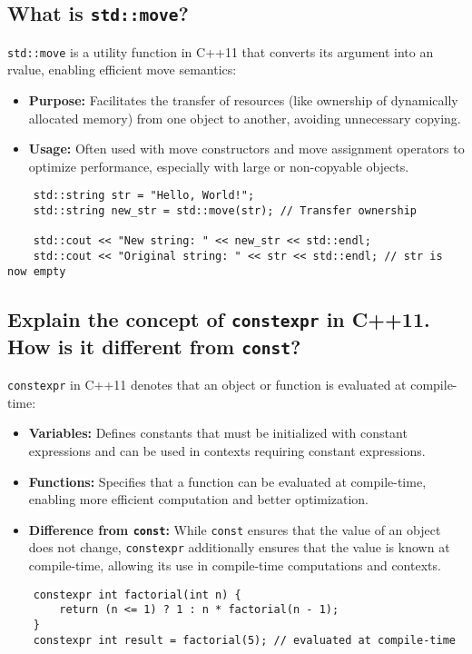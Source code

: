 \subsection{What is \texttt{std::move}?}
\texttt{std::move} is a utility function in C++11 that converts its argument into an rvalue, enabling efficient move semantics:
\begin{itemize}
    \item \textbf{Purpose:} Facilitates the transfer of resources (like ownership of dynamically allocated memory) from one object to another, avoiding unnecessary copying.
    \item \textbf{Usage:} Often used with move constructors and move assignment operators to optimize performance, especially with large or non-copyable objects.
\end{itemize}
\begin{tcolorbox}[title=\texttt{std::move} Example]
\begin{verbatim}
    std::string str = "Hello, World!";
    std::string new_str = std::move(str); // Transfer ownership

    std::cout << "New string: " << new_str << std::endl;
    std::cout << "Original string: " << str << std::endl; // str is now empty
\end{verbatim}
\end{tcolorbox}

\subsection{Explain the concept of \texttt{constexpr} in C++11. How is it different from \texttt{const}?}
\texttt{constexpr} in C++11 denotes that an object or function is evaluated at compile-time:
\begin{itemize}
    \item \textbf{Variables:} Defines constants that must be initialized with constant expressions and can be used in contexts requiring constant expressions.
    \item \textbf{Functions:} Specifies that a function can be evaluated at compile-time, enabling more efficient computation and better optimization.
    \item \textbf{Difference from \texttt{const}:} While \texttt{const} ensures that the value of an object does not change, \texttt{constexpr} additionally ensures that the value is known at compile-time, allowing its use in compile-time computations and contexts.
\end{itemize}
\begin{tcolorbox}[title=\texttt{constexpr} Example]
\begin{verbatim}
    constexpr int factorial(int n) {
        return (n <= 1) ? 1 : n * factorial(n - 1);
    }
    constexpr int result = factorial(5); // evaluated at compile-time
\end{verbatim}
\end{tcolorbox}
